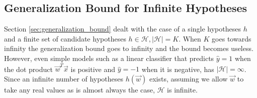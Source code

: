 \subsection{Generalization Bound for Infinite Hypotheses}
\label{subsec:generalization_bound_infinite}
Section \ref{sec:generalization_bound} dealt with the case of a single hypotheses $h$ and a finite set of candidate hypotheses $h\in\mathcal{H}, |\mathcal{H}| = K$. When $K$ goes towards infinity the generalization bound goes to infinity and the bound becomes useless. However, even simple models such as a linear classifier that predicts $\hat{y}=1$ when the dot product $\vec{w}^T\vec{x}$ is positive and $\hat{y}=-1$ when it is negative, has $|\mathcal{H}| = \infty$. Since an infinite number of hypotheses $h(\vec{w})$ exists, assuming we allow $\vec{w}$ to take any real values as is almost always the case, $\mathcal{H}$ is infinite. 

